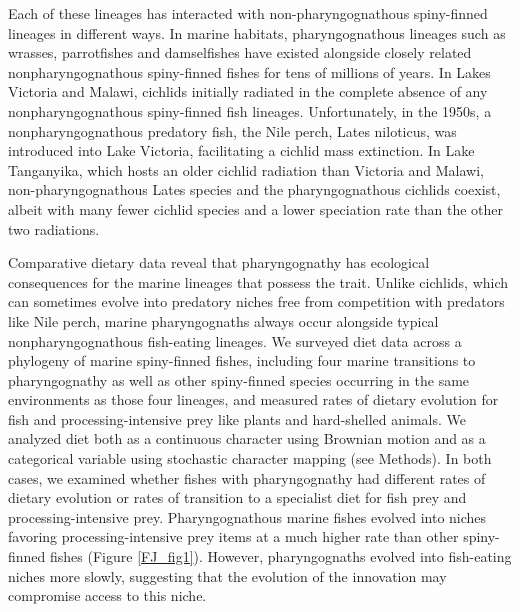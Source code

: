 Each of these lineages has interacted with non-pharyngognathous spiny-finned lineages in different ways. In marine habitats, pharyngognathous lineages such as wrasses, parrotfishes and damselfishes have existed alongside closely related nonpharyngognathous spiny-finned fishes for tens of millions of years. \cite{wainwright_evolution_2012} In Lakes Victoria and Malawi, cichlids initially radiated in the complete absence of any nonpharyngognathous spiny-finned fish lineages. Unfortunately, in the 1950s, a nonpharyngognathous predatory fish, the Nile perch, Lates niloticus, was introduced into Lake Victoria, facilitating a cichlid mass extinction. \cite{witte_destruction_1992} In Lake Tanganyika, which hosts an older cichlid radiation than Victoria and Malawi, non-pharyngognathous Lates species and the pharyngognathous cichlids coexist, albeit with many fewer cichlid species and a lower speciation rate than the other two radiations. \cite{seehausen_african_2006, tiercelin1991lake}

Comparative dietary data reveal that pharyngognathy has ecological consequences for the marine lineages that possess the trait. Unlike cichlids, which can sometimes evolve into predatory niches free from competition with predators like Nile perch, marine pharyngognaths always occur alongside typical nonpharyngognathous fish-eating lineages. \cite{wainwright_evolution_2012} We surveyed diet data across a phylogeny of marine spiny-finned fishes, including four marine transitions to pharyngognathy as well as other spiny-finned species occurring in the same environments as those four lineages, and measured rates of dietary evolution for fish and processing-intensive prey like plants and hard-shelled animals. We analyzed diet both as a continuous character using Brownian motion and as a categorical variable using stochastic character mapping (see Methods). In both cases, we examined whether fishes with pharyngognathy had different rates of dietary evolution or rates of transition to a specialist diet for fish prey and processing-intensive prey. Pharyngognathous marine fishes evolved into niches favoring processing-intensive prey items at a much higher rate than other spiny-finned fishes (Figure \ref{FJ_fig1}). However, pharyngognaths evolved into fish-eating niches more slowly, suggesting that the evolution of the innovation may compromise access to this niche.


